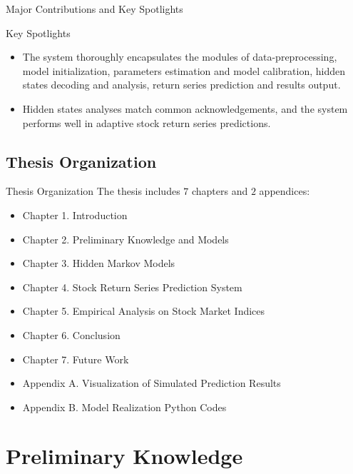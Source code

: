 \begin{frame}[fragile,t]{Major Contributions and Key Spotlights}
	\begin{block}{Key Spotlights}
	\begin{itemize}
		\item 
		The system \alert{thoroughly encapsulates} the modules of data-preprocessing, 
		model initialization, parameters estimation and model calibration, 
		hidden states decoding and analysis, return series prediction and results output.
		\item 
		Hidden states analyses match common acknowledgements, 
		and the system performs well in \alert{adaptive} stock return series predictions.
	\end{itemize}
		
	\end{block}

\end{frame}


\subsection{Thesis Organization}

\begin{frame}[fragile,t]{Thesis Organization}
	The thesis includes $7$ chapters and $2$ appendices:
	\begin{itemize}
	\item Chapter 1. Introduction
	\item Chapter 2. Preliminary Knowledge and Models
	\item Chapter 3. Hidden Markov Models
	\item Chapter 4. Stock Return Series Prediction System
	\item Chapter 5. Empirical Analysis on Stock Market Indices
	\item Chapter 6. Conclusion
	\item Chapter 7. Future Work
	\item Appendix A. Visualization of Simulated Prediction Results
	\item Appendix B. Model Realization Python Codes
	\end{itemize}

\end{frame}


\section{\large Preliminary Knowledge}

